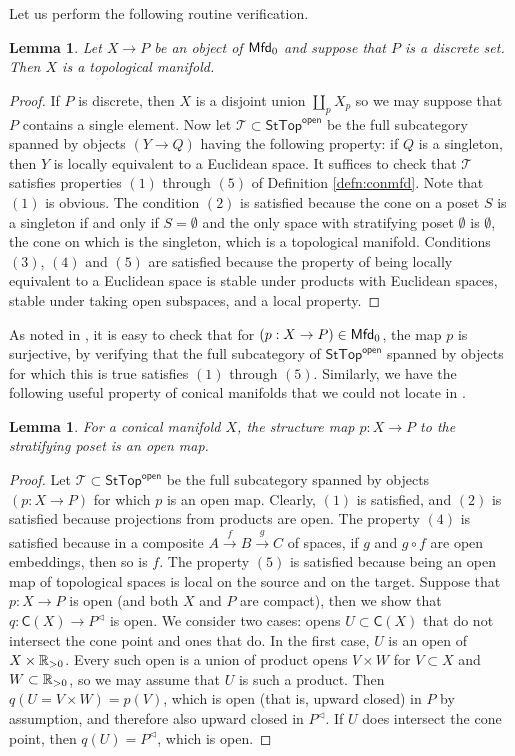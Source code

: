 \documentclass[10pt, reqno, twoside
, final
]{amsart}
\numberwithin{equation}{subsection}%
\theoremstyle{definition}
\theoremstyle{definition}
\theoremstyle{definition}
\theoremstyle{definition}
\theoremstyle{definition}
\theoremstyle{definition}
\theoremstyle{definition}
\theoremstyle{definition}
\theoremstyle{definition}
\theoremstyle{plain}
\theoremstyle{definition}
\theoremstyle{plain}
\theoremstyle{definition}
\theoremstyle{plain}
\theoremstyle{definition}
\theoremstyle{definition}
\theoremstyle{plain}
\newtheorem{lem}[defn]{Lemma}
\theoremstyle{plain}
\theoremstyle{definition}
\theoremstyle{plain}
\theoremstyle{plain}
\theoremstyle{plain}
\begin{document}
Let us perform the following routine verification.
\begin{lem}
Let $X\rightarrow P$ be an object of $\mathsf{Mfd}_0$ and suppose that $P$ is a discrete set. Then $X$ is a topological manifold. 
\end{lem}
\begin{proof}
If $P$ is discrete, then $X$ is a disjoint union $\coprod_pX_p$ so we may suppose that $P$ contains a single element. Now let $\mathcal{T}\subset \mathsf{StTop}^{\mathsf{open}}$ be the full subcategory spanned by objects $(Y\rightarrow Q)$ having the following property: if $Q$ is a singleton, then $Y$ is locally equivalent to a Euclidean space. It suffices to check that $\mathcal{T}$ satisfies properties $(1)$ through $(5)$ of Definition \ref{defn:conmfd}. Note that $(1)$ is obvious. The condition $(2)$ is satisfied because the cone on a poset $S$ is a singleton if and only if $S=\emptyset$ and the only space with stratifying poset $\emptyset$ is $\emptyset$, the cone on which is the singleton, which is a topological manifold. Conditions $(3)$, $(4)$ and $(5)$ are satisfied because the property of being locally equivalent to a Euclidean space is stable under products with Euclidean spaces, stable under taking open subspaces, and a local property. 
\end{proof}

As noted in \cite{AFT-local-structures}, it is easy to check that for $(p:X\rightarrow P)\in \mathsf{Mfd}_0$, the map $p$ is surjective, by verifying that the full subcategory of $\mathsf{StTop}^{\mathsf{open}}$ spanned by objects for which this is true satisfies $(1)$ through $(5)$. Similarly, we have the following useful property of conical manifolds that we could not locate in \cite{AFT-local-structures}.
\begin{lem}\label{lem:structuremapisopen}
For a conical manifold $X$, the structure map $p:X\rightarrow P$ to the stratifying poset is an open map.      
\end{lem}
\begin{proof}
Let $\mathcal{T}\subset \mathsf{StTop}^{\mathsf{open}}$ be the full subcategory spanned by objects $(p:X\rightarrow P)$ for which $p$ is an open map. Clearly, $(1)$ is satisfied, and $(2)$ is satisfied because projections from products are open. The property $(4)$ is satisfied because in a composite $A\overset{f}{\rightarrow}B\overset{g}{\rightarrow}C$ of spaces, if $g$ and $g\circ f$ are open embeddings, then so is $f$. The property $(5)$ is satisfied because being an open map of topological spaces is local on the source and on the target. Suppose that $p:X\rightarrow P$ is open (and both $X$ and $P$ are compact), then we show that $q:\mathsf{C}(X)\rightarrow P^{\lhd}$ is open. We consider two cases: opens $U\subset \mathsf{C}(X)$ that do not intersect the cone point and ones that do. In the first case, $U$ is an open of $X\times \mathbb{R}_{>0}$. Every such open is a union of product opens $V\times W$ for $V\subset X$ and $W\subset \mathbb{R}_{>0}$, so we may assume that $U$ is such a product. Then $q(U=V\times W)=p(V)$, which is open (that is, upward closed) in $P$ by assumption, and therefore also upward closed in $P^{\lhd}$. If $U$ does intersect the cone point, then $q(U)=P^{\lhd}$, which is open.
\end{proof}
\end{document}
